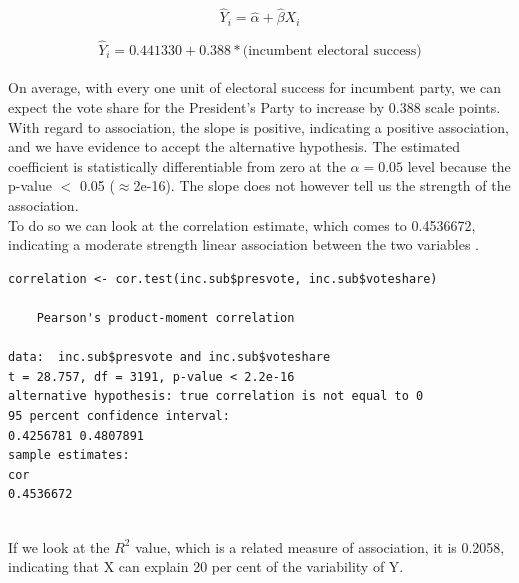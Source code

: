 \documentclass[12pt,letterpaper]{article}
\begin{document}
{\large 			$$\hat{Y}_i = \hat{\alpha} +  \hat{\beta}X_i $$}


{ 			$$\hat{Y}_i =  0.441330 +  0.388 * \text{(incumbent electoral success)} $$} \\


\noindent On average, with every one unit of electoral success for incumbent party, we can expect the vote share for the President's Party to increase by 0.388 scale points.\\

With regard to association, the slope is positive, indicating a positive association, and we have evidence to accept the alternative hypothesis. The estimated coefficient is statistically differentiable from zero at the $\alpha=0.05$ level because the p-value $<$ 0.05 ($\approx $2e-16). The slope does not however tell us the strength of the association. \\

To do so we can look at the correlation estimate, which comes to 0.4536672, indicating a moderate strength linear association between the two variables .

	\begin{verbatim}
correlation <- cor.test(inc.sub$presvote, inc.sub$voteshare)

	Pearson's product-moment correlation

data:  inc.sub$presvote and inc.sub$voteshare
t = 28.757, df = 3191, p-value < 2.2e-16
alternative hypothesis: true correlation is not equal to 0
95 percent confidence interval:
0.4256781 0.4807891
sample estimates:
cor 
0.4536672 
	
\end{verbatim}

If we look at the $R^2$ value, which is a related measure of association, it is 0.2058, indicating that X can explain 20 per cent of the variability of Y. 




\newpage	
\end{document}
